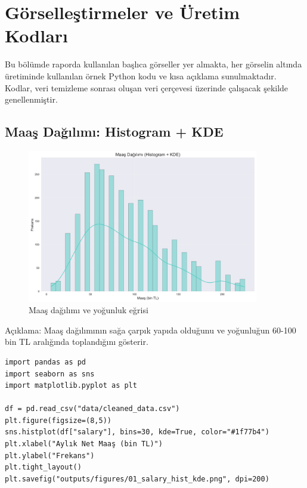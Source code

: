 \documentclass[12pt,a4paper]{article}
\begin{document}
\section{Görselleştirmeler ve Üretim Kodları}

Bu bölümde raporda kullanılan başlıca görseller yer almakta, her görselin altında üretiminde kullanılan örnek Python kodu ve kısa açıklama sunulmaktadır. Kodlar, veri temizleme sonrası oluşan veri çerçevesi üzerinde çalışacak şekilde genellenmiştir.

\subsection{Maaş Dağılımı: Histogram + KDE}
\begin{figure}[H]
    \centering
    \includegraphics[width=0.9\textwidth]{01_salary_hist_kde.png}
    \caption{Maaş dağılımı ve yoğunluk eğrisi}
\end{figure}

\noindent Açıklama: Maaş dağılımının sağa çarpık yapıda olduğunu ve yoğunluğun 60-100 bin TL aralığında toplandığını gösterir.

\begin{lstlisting}[style=python, caption={Histogram + KDE üretim kodu}]
import pandas as pd
import seaborn as sns
import matplotlib.pyplot as plt

df = pd.read_csv("data/cleaned_data.csv")
plt.figure(figsize=(8,5))
sns.histplot(df["salary"], bins=30, kde=True, color="#1f77b4")
plt.xlabel("Aylık Net Maaş (bin TL)")
plt.ylabel("Frekans")
plt.tight_layout()
plt.savefig("outputs/figures/01_salary_hist_kde.png", dpi=200)
\end{lstlisting}
\end{document}
